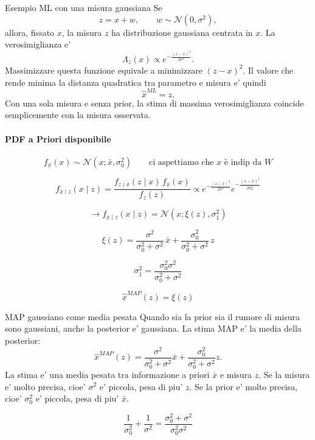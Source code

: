 \documentclass[11pt,a4paper]{article}
\begin{document}
\begin{spiegazione}{Esempio ML con una misura gaussiana}
Se
\[
z=x+w,\qquad w\sim\mathcal N(0,\sigma^2),
\]
allora, fissato $x$, la misura $z$ ha distribuzione gaussiana centrata in $x$. La verosimiglianza e'
\[
\Lambda_z(x)\propto e^{-\frac{(z-x)^2}{2\sigma^2}}.
\]
Massimizzare questa funzione equivale a minimizzare $(z-x)^2$. Il valore che rende minima la distanza quadratica tra parametro e misura e' quindi
\[
\hat x^{ML}=z.
\]
Con una sola misura e senza prior, la stima di massima verosimiglianza coincide semplicemente con la misura osservata.
\end{spiegazione}

\paragraph{PDF a Priori disponibile}

\[
f_{\overline{\underline{x}}}(x)\sim \mathcal N(x;\bar x,\sigma_0^2)
\qquad
\text{ci aspettiamo che }x\text{ è indip da }W
\]

\[
f_{\overline{\underline{x}}\mid z}(x\mid z)
=
\frac{f_{z\mid \overline{\underline{x}}}(z\mid x)\,f_{\overline{\underline{x}}}(x)}{f_z(z)}
\propto
e^{-\frac{(z-x)^2}{2\sigma^2}}
e^{-\frac{(x-\bar x)^2}{2\sigma_0^2}}
\]

\[
\to
f_{\overline{\underline{x}}\mid z}(x\mid z)
=
\mathcal N(x;\xi(z),\sigma_1^2)
\]

\[
\xi(z)
=
\frac{\sigma^2}{\sigma_0^2+\sigma^2}\,\bar x
+
\frac{\sigma_0^2}{\sigma_0^2+\sigma^2}\,z
\]


\[
\sigma_1^2
=
\frac{\sigma_0^2\sigma^2}{\sigma_0^2+\sigma^2}
\]

\[
\hat x^{MAP}(z)=\xi(z)
\]

\begin{spiegazione}{MAP gaussiano come media pesata}
Quando sia la prior sia il rumore di misura sono gaussiani, anche la posterior e' gaussiana. La stima MAP e' la media della posterior:
\[
\hat x^{MAP}(z)=
\frac{\sigma^2}{\sigma_0^2+\sigma^2}\bar x
+
\frac{\sigma_0^2}{\sigma_0^2+\sigma^2}z.
\]
La stima e' una media pesata tra informazione a priori $\bar x$ e misura $z$. Se la misura e' molto precisa, cioe' $\sigma^2$ e' piccola, pesa di piu' $z$. Se la prior e' molto precisa, cioe' $\sigma_0^2$ e' piccola, pesa di piu' $\bar x$.
\end{spiegazione}

\[
\frac{1}{\sigma_0^2}+\frac{1}{\sigma^2}
=
\frac{\sigma_0^2+\sigma^2}{\sigma_0^2\sigma^2}
\]
\end{document}
